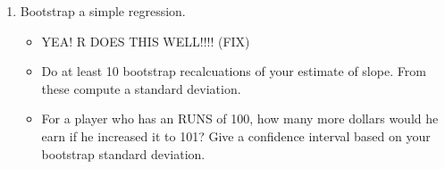 \documentclass[11pt]{article}
\begin{document}
\begin{enumerate}
\begin{enumerate}
\begin{itemize}
\end{itemize}
\item Bootstrap a simple regression.
\begin{itemize}
\item YEA!   R DOES THIS WELL!!!!  (FIX)
\item Do at least 10 bootstrap recalcuations of your estimate of
slope.  From these compute a standard deviation.
\item For a player who has an RUNS of 100, how many more dollars would
he earn if he increased it to 101?  Give a confidence interval based
on your bootstrap standard deviation.
\end{itemize}
\end{enumerate}
\end{enumerate}
\end{document}
